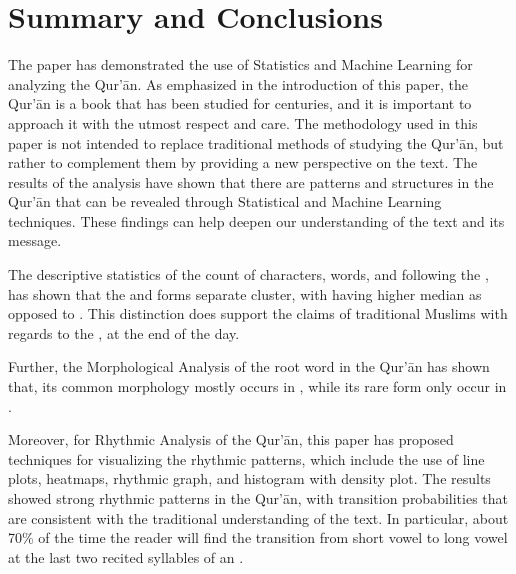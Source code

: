 \chapter{Summary and Conclusions}\label{ch:conclusion}
The paper has demonstrated the use of Statistics and Machine Learning for analyzing the Qur'\=an. As emphasized in the introduction of this paper, the Qur'\=an is a book that has been studied for centuries, and it is important to approach it with the utmost respect and care. The methodology used in this paper is not intended to replace traditional methods of studying the Qur'\=an, but rather to complement them by providing a new perspective on the text. The results of the analysis have shown that there are patterns and structures in the Qur'\=an that can be revealed through Statistical and Machine Learning techniques. These findings can help deepen our understanding of the text and its message.

The descriptive statistics of the count of characters, words, and   following the  , has shown that the   and  \newline{}  forms separate cluster, with   having higher median as opposed to  . This distinction does support the claims of traditional Muslims with regards to the  , at the end of the day.

Further, the Morphological Analysis of the root word   in the Qur'\=an has shown that, its common morphology   mostly occurs in  , while its rare form only occur in  .

Moreover, for Rhythmic Analysis of the Qur'\=an, this paper has proposed techniques for visualizing the rhythmic patterns, which include the use of line plots, heatmaps, rhythmic graph, and histogram with density plot. The results showed strong rhythmic patterns in the Qur'\=an, with transition probabilities that are consistent with the traditional understanding of the text. In particular, about 70\% of the time the reader will find the transition from short vowel to long vowel at the last two recited syllables of an  .

